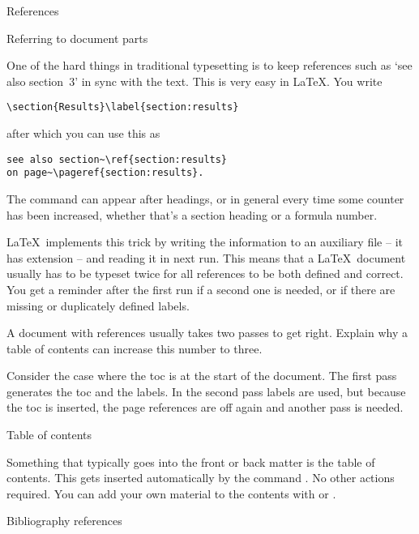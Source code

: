  {References}

 {Referring to document parts}

One of the hard things in traditional typesetting is to keep
references such as `see also section~3' in sync with the text.
This is very easy in \LaTeX. You write
\begin{verbatim}
\section{Results}\label{section:results}
\end{verbatim}
after which you can use this as
\begin{verbatim}
see also section~\ref{section:results}
on page~\pageref{section:results}.
\end{verbatim}
The  command can appear after headings, or in general
every time some counter has been increased, whether that's a section
heading or a formula number.

\LaTeX\ implements this trick by writing the information to an
auxiliary file -- it has extension  -- and reading it in next
run. This means that a \LaTeX\ document usually has to be typeset
twice for all references to be both defined and correct. You get a
reminder after the first run if a second one is needed, or if there
are missing or duplicately defined labels.

\begin{594exercise}
A document with references usually takes two passes to get
  right. Explain why a table of contents can increase this number to
  three.
\end{594exercise}
\begin{answer}
Consider the case where the toc is at the start of the document.
The first pass generates the toc and the labels. In the second pass
labels are used, but because the toc is inserted, the page references
are off again and another pass is needed.
\end{answer}

 {Table of contents}
\label{sec:toc}

Something that typically goes into the front or back matter is the
table of contents. This gets inserted automatically by the command
. No other actions required. You can add your
own material to the contents with  or
.

 {Bibliography references}

